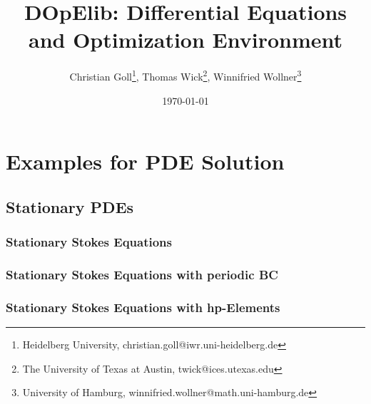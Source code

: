 \documentclass[a4paper,cleardoubleempty]{scrreprt}
\theoremstyle{plain}
\theoremstyle{remark}
\begin{document}
\title{DOpElib: 
Differential Equations\\ and Optimization Environment}
\author{
  Christian Goll\thanks{Heidelberg University, 
    {christian.goll@iwr.uni-heidelberg.de}}, 
  Thomas Wick\thanks{The University of Texas at Austin, 
    {twick@ices.utexas.edu}}, 
  Winnifried Wollner\thanks{University of Hamburg, 
    {winnifried.wollner@math.uni-hamburg.de}}
}



\date{\today}

\maketitle
\cleardoublepage\pagestyle{headings}
\tableofcontents
\cleardoublepage







\chapter{Examples for PDE Solution}
\label{PDE}
\section{Stationary PDEs} 
\label{PDE_Stat}
\subsection{Stationary Stokes Equations} 
\label{PDE_Stat_Stokes}

\clearpage
\subsection{Stationary Stokes Equations with periodic BC} 
\label{PDE_Stat_Periodic_Stokes}

\clearpage
\subsection{Stationary Stokes Equations with hp-Elements} 
\label{PDE_Stat_Stokes_hp}

\clearpage
\end{document}
